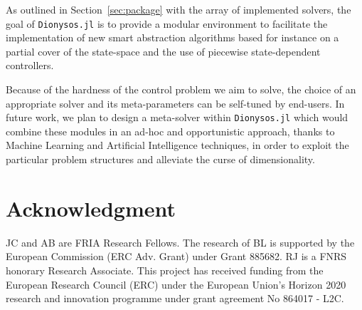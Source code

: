 \documentclass{juliacon}
\begin{document}
\vskip 6pt
%
As outlined in Section~\ref{sec:package} with the array of implemented solvers, the goal of \texttt{Dionysos.jl} is to provide a modular environment to facilitate the implementation of new smart abstraction algorithms based for instance on a partial cover of the state-space and the use of piecewise state-dependent controllers.

\vskip 6pt
Because of the hardness of the control problem we aim to solve, the choice of an appropriate solver and its meta-parameters can be self-tuned by end-users.
In future work, we plan to design a meta-solver within \texttt{Dionysos.jl} which would combine these modules in an ad-hoc and opportunistic approach, thanks to Machine Learning and Artificial Intelligence techniques, in order to exploit the particular problem structures and alleviate the curse of dimensionality.

\section{Acknowledgment}
JC and AB are FRIA Research Fellows.
The research of BL is supported by the European Commission (ERC Adv. Grant) under Grant 885682.
RJ is a FNRS honorary Research Associate. This project has received funding from the European Research Council (ERC) under the European Union's Horizon 2020 research and innovation programme under grant agreement No 864017 - L2C.


%

\end{document}
